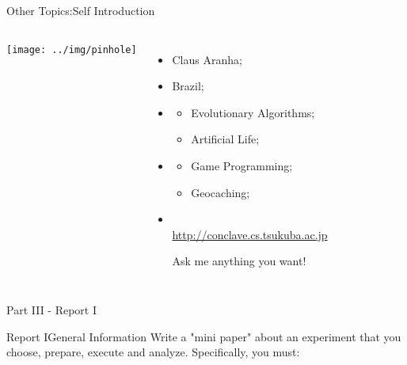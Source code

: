 \documentclass[aspectratio=169]{beamer}
\begin{document}
\begin{CJK}{UTF8}{ipxm}



\begin{frame}{Other Topics:}{Self Introduction}
  \begin{columns}
    \texttt{[image: ../img/pinhole]}
    {\small
    \begin{itemize}
      \item {} Claus Aranha;
      \item {} Brazil;
      \item {}
      \begin{itemize}
        \item Evolutionary Algorithms;
        \item Artificial Life;
      \end{itemize}
      \item {}
      \begin{itemize}
        \item Game Programming;
        \item Geocaching;
      \end{itemize}
        \smallskip

      \item {}\\
      {\smaller \url{http://conclave.cs.tsukuba.ac.jp}}
      \medskip

      Ask me anything you want!
    \end{itemize}
    }
  \end{columns}
\end{frame}

\begin{frame}{}
  \begin{center}
    Part III - Report I
  \end{center}
\end{frame}

\begin{frame}{Report I}{General Information}
  Write a "mini paper" about an experiment that you choose, prepare, execute and analyze. Specifically, you must:\medskip


\end{frame}
\end{CJK}
\end{document}
